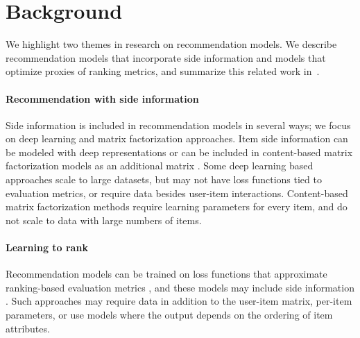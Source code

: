 \section{Background}


We highlight two themes in research on recommendation models. We describe
recommendation models that incorporate side information and models that optimize
proxies of ranking metrics, and summarize this related work
in~.

\paragraph{Recommendation with side information} Side information is included in
recommendation models in several ways; we focus on deep learning and matrix
factorization approaches. Item side information can be modeled with deep
representations
\cite{zhang2017deep,bansal2016ask-the-gru:,lian2018towards,dong2017a-hybrid,chen2017joint,liang2018trsdl:,zuo2016tag-aware,xu2017tag-aware}
or can be included in content-based matrix factorization models as an additional
matrix
\cite{shi2014collaborative,gopalan2014content-based,wang2011collaborative,zhen2009tagicofi:,loepp2019interactive,bogers2018tag-based}.
Some deep learning based approaches scale to large datasets, but may not have
loss functions tied to evaluation metrics, or require data besides user-item
interactions. Content-based matrix factorization methods require learning
parameters for every item, and do not scale to data with large numbers of items.

\paragraph{Learning to rank} Recommendation models can be trained on loss
functions that approximate ranking-based evaluation metrics
\cite{yu2018walkranker:,liang2018top-n-rank:,rendle2009bpr:,song2018neural}, and
these models may include side information
\cite{shi2012tfmap:,yuan2016optimizing,ying2016collaborative,cao2017embedding,okura2017embedding-based}.
Such approaches may require data in addition to the user-item matrix, per-item
parameters, or use models where the output depends on the ordering of item
attributes.



